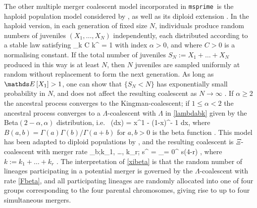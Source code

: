 \documentclass{article}
\newcommand{\msprime}[0]{\texttt{msprime}}
\begin{document}
The other multiple merger coalescent model incorporated in \msprime\ is
the haploid population model considered by \cite{schweinsberg03},
as well as its diploid extension \citep{BLS15}.  In the haploid
version, in each generation of fixed size $N$, individuals produce random numbers of
juveniles $(X_1, \ldots, X_N)$ independently, each distributed according to a stable law satisfying
\be\label{jX} \lim_{k\to \infty} C k^\alpha {} = 1 \ee
with index $\alpha > 0$, and where $C > 0$ is a normalising constant.
If the  total number of juveniles $S_N := X_1 + \ldots + X_N$ produced
in this way is at least $N$, then $N$ juveniles are sampled uniformly at random
without replacement to form the next generation.
As long as $\EE{X_1} > 1$, one can show that $\{ S_N < N \}$ has exponentially small
probability in $N$, and does not affect the resulting coalescent as $N \to \infty$ \citep{schweinsberg03}.
If $\alpha \ge 2$ the ancestral process converges to the Kingman-coalescent; if
$1 \le \alpha < 2$ the ancestral process converges to a $\Lambda$-coalescent
with $\Lambda$ in \eqref{lambdabk} given by the Beta$(2-\alpha, \alpha)$ distribution, i.e.\
\be\label{Fbeta} \Lambda(dx) =  
x^{1 - \alpha}(1-x)^{\alpha - 1}  dx, \ee where
$B(a,b) = \Gamma(a)\Gamma(b)/\Gamma(a+b)$ for $a,b > 0$ is the
beta function \citep{schweinsberg03}.
This model has been adapted to diploid populations
by \cite{BLS15}, and the resulting coalescent is $\Xi$-coalescent with merger rate
\be\label{xibeta} \lambda_{b;k_1, \ldots, k_r; s}^{\text{Beta}} = \sum_{\ell = 0}^{ s\wedge (4-r) }  
\frac{B(k+\ell - \alpha, s-\ell + \alpha ) }{B(2-\alpha,\alpha)}, \ee
where $k := k_1 + \ldots + k_r$ \citep{blath2016site,BLS15}. The interpretation of \eqref{xibeta} is  that the
random number of lineages participating in a potential merger is governed by the
$\Lambda$-coalescent with rate \eqref{Fbeta}, and all participating lineages are
randomly allocated into one of four groups corresponding to the four parental
chromosomes, giving rise to up to four simultaneous mergers.
\end{document}
